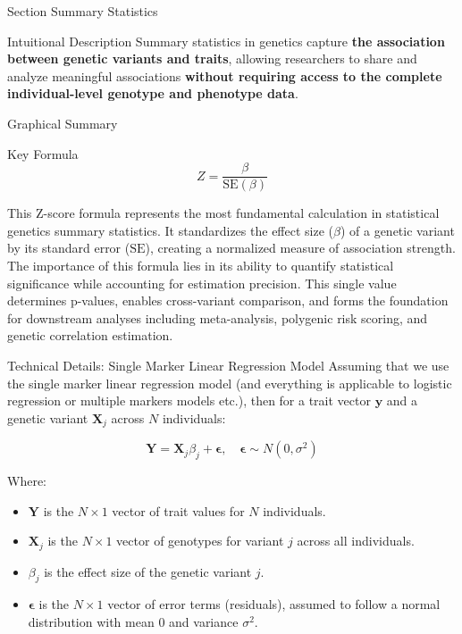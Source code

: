 
\begin{frame}{Section}
\centering
\Huge{Summary Statistics}
\end{frame}


\begin{frame}{Intuitional Description}
Summary statistics in genetics capture \textbf{the association between genetic variants and traits}, allowing researchers to share and analyze meaningful associations \textbf{without requiring access to the complete individual-level genotype and phenotype data}.
\end{frame}

\begin{frame}{Graphical Summary}

\end{frame}


\begin{frame}{Key Formula}
$$
Z = \frac{\beta}{\text{SE}(\beta)}
$$

This Z-score formula represents the most fundamental calculation in statistical genetics summary statistics. It standardizes the effect size ($\beta$) of a genetic variant by its standard error ($\text{SE}$), creating a normalized measure of association strength. The importance of this formula lies in its ability to quantify statistical significance while accounting for estimation precision. This single value determines p-values, enables cross-variant comparison, and forms the foundation for downstream analyses including meta-analysis, polygenic risk scoring, and genetic correlation estimation.

\end{frame}


\begin{frame}{Technical Details: Single Marker Linear Regression Model}
Assuming that we use the single marker linear regression model (and everything is applicable to logistic regression or multiple markers models etc.), then for a trait vector $ \mathbf{y} $ and a genetic variant $ \mathbf{X}_j $ across $ N $ individuals:

$$
\mathbf{Y} = \mathbf{X}_j \beta_j + \boldsymbol{\epsilon}, \quad \boldsymbol{\epsilon} \sim N(0, \sigma^2)
$$

Where:
\begin{itemize}
\item $ \mathbf{Y} $ is the $ N \times 1 $ vector of trait values for $ N $ individuals.
\item $ \mathbf{X}_j $ is the $ N \times 1 $ vector of genotypes for variant $ j $ across all individuals.
\item $ \beta_j $ is the effect size of the genetic variant $ j $.
\item $ \boldsymbol{\epsilon} $ is the $ N \times 1 $ vector of error terms (residuals), assumed to follow a normal distribution with mean 0 and variance $ \sigma^2 $.
\end{itemize}

\end{frame}

